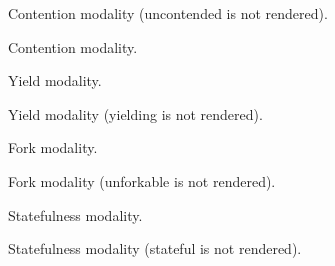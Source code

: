 \begin{ocamlindent}
\label{Oxcaml--type-modalities_all.f_uncontended}%
\begin{ocamlindent}Contention modality (uncontended is not rendered).\end{ocamlindent}%
\label{Oxcaml--type-modalities_all.f_contended}%
\begin{ocamlindent}Contention modality.\end{ocamlindent}%
\label{Oxcaml--type-modalities_all.f_unyielding}%
\begin{ocamlindent}Yield modality.\end{ocamlindent}%
\label{Oxcaml--type-modalities_all.f_yielding}%
\begin{ocamlindent}Yield modality (yielding is not rendered).\end{ocamlindent}%
\label{Oxcaml--type-modalities_all.f_forkable}%
\begin{ocamlindent}Fork modality.\end{ocamlindent}%
\label{Oxcaml--type-modalities_all.f_unforkable}%
\begin{ocamlindent}Fork modality (unforkable is not rendered).\end{ocamlindent}%
\label{Oxcaml--type-modalities_all.f_stateless}%
\begin{ocamlindent}Statefulness modality.\end{ocamlindent}%
\label{Oxcaml--type-modalities_all.f_stateful}%
\begin{ocamlindent}Statefulness modality (stateful is not rendered).\end{ocamlindent}%
\label{Oxcaml--type-modalities_all.f_immutable}%

\end{ocamlindent}
